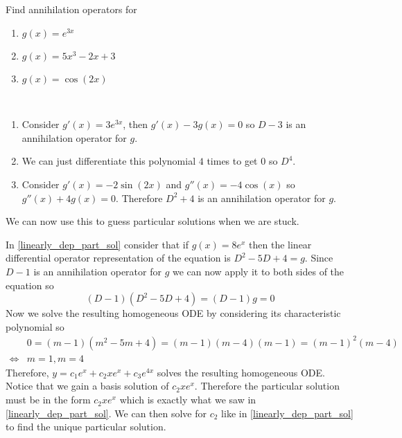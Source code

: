 \documentclass[notes]{subfiles}
\begin{document}
\begin{exercise}
    Find annihilation operators for
    \begin{enumerate}[label = (\alph*)]
        \item $g(x) = e^{3x}$
        \item $g(x) = 5x^3 - 2x + 3$
        \item $g(x) = \cos(2x)$
    \end{enumerate}
\end{exercise}
\begin{solution}
    ~

    \begin{enumerate}[label = (\alph*)]
        \item Consider $g'(x) = 3e^{3x}$, then $g'(x) - 3g(x) = 0$ so $D - 3$ is an annihilation operator for $g$.
        \item We can just differentiate this polynomial $4$ times to get $0$ so $D^4$.
        \item Consider $g'(x) = -2\sin(2x)$ and $g''(x) = -4\cos(x)$ so $g''(x) + 4g(x) = 0$. Therefore $D^2 + 4$ is an annihilation operator for $g$.
    \end{enumerate}
\end{solution}

We can now use this to guess particular solutions when we are stuck.

In \cref{linearly_dep_part_sol} consider that if $g(x) = 8e^x$ then the linear differential operator representation of the equation is $D^2 - 5D + 4 = g$. Since $D - 1$ is an annihilation operator for $g$ we can now apply it to both sides of the equation so
\[
    (D - 1)(D^2 - 5D + 4) = (D - 1)g = 0
\]
Now we solve the resulting homogeneous ODE by considering its characteristic polynomial so
\begin{align*}
    &0 = (m - 1)(m^2 - 5m + 4) = (m - 1)(m - 4)(m - 1) = (m - 1)^2(m - 4) \\
    \iff& m = 1, m = 4
\end{align*}
Therefore, $y = c_1e^x + c_2xe^x + c_3e^{4x}$ solves the resulting homogeneous ODE. Notice that we gain a basis solution of $c_2xe^x$. Therefore the particular solution must be in the form $c_2xe^x$ which is exactly what we saw in \cref{linearly_dep_part_sol}. We can then solve for $c_2$ like in \cref{linearly_dep_part_sol} to find the unique particular solution.
\end{document}
